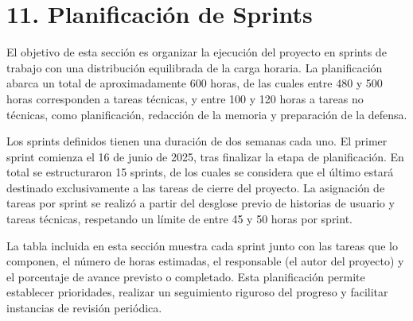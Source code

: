 \documentclass[
11pt, %
]{charter}
\begin{document}
\vspace{25px}

\section{11. Planificación de Sprints}

El objetivo de esta sección es organizar la ejecución del proyecto en sprints de trabajo con una distribución equilibrada de la carga horaria. La planificación abarca un total de aproximadamente 600 horas, de las cuales entre 480 y 500 horas corresponden a tareas técnicas, y entre 100 y 120 horas a tareas no técnicas, como planificación, redacción de la memoria y preparación de la defensa.

Los sprints definidos tienen una duración de dos semanas cada uno. El primer sprint comienza el 16 de junio de 2025, tras finalizar la etapa de planificación. En total se estructuraron 15 sprints, de los cuales se considera que el último estará destinado exclusivamente a las tareas de cierre del proyecto. La asignación de tareas por sprint se realizó a partir del desglose previo de historias de usuario y tareas técnicas, respetando un límite de entre 45 y 50 horas por sprint.

La tabla incluida en esta sección muestra cada sprint junto con las tareas que lo componen, el número de horas estimadas, el responsable (el autor del proyecto) y el porcentaje de avance previsto o completado. Esta planificación permite establecer prioridades, realizar un seguimiento riguroso del progreso y facilitar instancias de revisión periódica.
\end{document}
